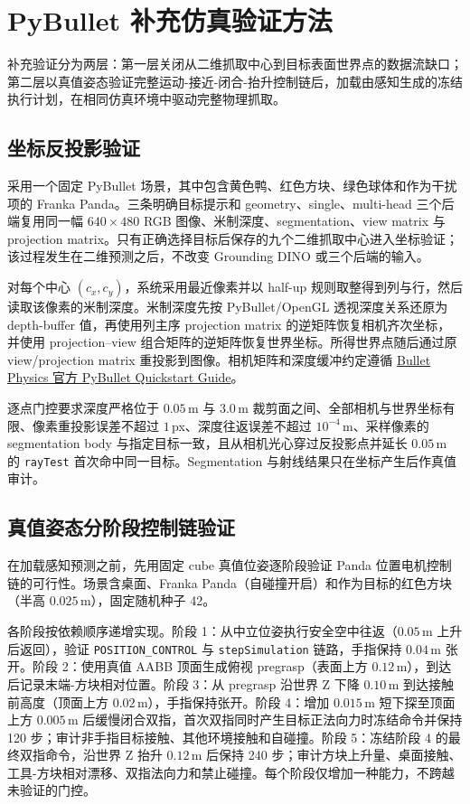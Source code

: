 \documentclass{l4proj}
\begin{document}
\section{PyBullet 补充仿真验证方法}

补充验证分为两层：第一层关闭从二维抓取中心到目标表面世界点的数据流缺口；第二层以真值姿态验证完整运动-接近-闭合-抬升控制链后，加载由感知生成的冻结执行计划，在相同仿真环境中驱动完整物理抓取。

\subsection{坐标反投影验证}
采用一个固定 PyBullet 场景，其中包含黄色鸭、红色方块、绿色球体和作为干扰项的 Franka Panda。三条明确目标提示和 geometry、single、multi-head 三个后端复用同一幅 $640\times480$ RGB 图像、米制深度、segmentation、view matrix 与 projection matrix。只有正确选择目标后保存的九个二维抓取中心进入坐标验证；该过程发生在二维预测之后，不改变 Grounding DINO 或三个后端的输入。

对每个中心 $(c_x,c_y)$，系统采用最近像素并以 half-up 规则取整得到列与行，然后读取该像素的米制深度。米制深度先按 PyBullet/OpenGL 透视深度关系还原为 depth-buffer 值，再使用列主序 projection matrix 的逆矩阵恢复相机齐次坐标，并使用 projection--view 组合矩阵的逆矩阵恢复世界坐标。所得世界点随后通过原 view/projection matrix 重投影到图像。相机矩阵和深度缓冲约定遵循 \href{https://github.com/bulletphysics/bullet3/blob/master/docs/pybullet_quickstartguide.pdf}{Bullet Physics 官方 PyBullet Quickstart Guide}。

逐点门控要求深度严格位于 $0.05$\,m 与 $3.0$\,m 裁剪面之间、全部相机与世界坐标有限、像素重投影误差不超过 $1$\,px、深度往返误差不超过 $10^{-4}$\,m、采样像素的 segmentation body 与指定目标一致，且从相机光心穿过反投影点并延长 $0.05$\,m 的 \texttt{rayTest} 首次命中同一目标。Segmentation 与射线结果只在坐标产生后作真值审计。

\subsection{真值姿态分阶段控制链验证}
在加载感知预测之前，先用固定 cube 真值位姿逐阶段验证 Panda 位置电机控制链的可行性。场景含桌面、Franka Panda（自碰撞开启）和作为目标的红色方块（半高 $0.025$\,m），固定随机种子 42。

各阶段按依赖顺序递增实现。阶段 1：从中立位姿执行安全空中往返（$0.05$\,m 上升后返回），验证 \texttt{POSITION\_CONTROL} 与 \texttt{stepSimulation} 链路，手指保持 $0.04$\,m 张开。阶段 2：使用真值 AABB 顶面生成俯视 pregrasp（表面上方 $0.12$\,m），到达后记录末端-方块相对位置。阶段 3：从 pregrasp 沿世界 Z 下降 $0.10$\,m 到达接触前高度（顶面上方 $0.02$\,m），手指保持张开。阶段 4：增加 $0.015$\,m 短下探至顶面上方 $0.005$\,m 后缓慢闭合双指，首次双指同时产生目标正法向力时冻结命令并保持 120 步；审计非手指目标接触、其他环境接触和自碰撞。阶段 5：冻结阶段 4 的最终双指命令，沿世界 Z 抬升 $0.12$\,m 后保持 240 步；审计方块上升量、桌面接触、工具-方块相对漂移、双指法向力和禁止碰撞。每个阶段仅增加一种能力，不跨越未验证的门控。
\end{document}
